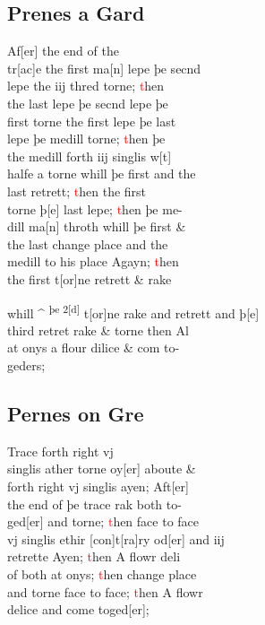 \documentclass[12pt,letter]{article} %
\newcommand{\red}[1]{\textcolor{red}{#1}}
\newcommand{\srcpg}[1]{
    \noindent{
        \color{Gray}{\rule[0.5ex]{\linewidth}{1pt}~#1} 
    
    }
}
\begin{document}
\subsection{Prenes a Gard}
Af{[}er{]} the end of the\\
tr{[}ac{]}e the first ma{[}n{]} lepe þe secnd\\
lepe the iij thred torne; \red{t}hen\\
the last lepe þe secnd lepe þe\\
first torne the first lepe þe last\\
lepe þe medill torne; \red{t}hen þe\\ 
the medill forth iij singlis w{[}t{]}\\
halfe a torne whill þe first and the\\
last retrett; \red{t}hen the first\\
torne þ{[}e{]} last lepe; \red{t}hen þe me-\\
dill ma{[}n{]} throth whill þe first \&\\
the last change place and the\\
medill to his place Agayn; \red{t}hen\\
the first t{[}or{]}ne retrett \& rake
\srcpg{60}
 whill \^{} \textsuperscript{þe 2{[}d{]}} t{[}or{]}ne rake and retrett and þ{[}e{]}\\
third retret rake \& torne then Al\\
at onys a flour dilice \& com to-\\
geders;

\subsection{Pernes on Gre}
Trace forth right vj\\
singlis ather torne oy{[}er{]} aboute \&\\
forth right vj singlis ayen; Aft{[}er{]}\\
the end of þe trace rak both to-\\
ged{[}er{]} and torne; \red{t}hen face to face\\
vj singlis  ethir {[}con{]}t{[}ra{]}ry od{[}er{]} and iij\\
retrette Ayen; \red{t}hen A flowr deli\\
of both at onys; \red{t}hen change place\\
and torne face to face; \red{t}hen A flowr\\
delice and come toged{[}er{]};
\end{document}
